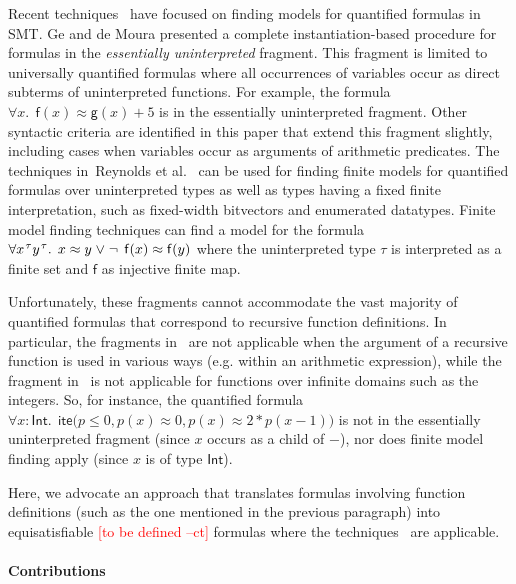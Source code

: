 \documentclass[runningheads,a4paper]{llncs}
\newcommand{\con}[1]{\mathsf{#1}}
\let\oldneg=\neg
\def\neg{\oldneg\:}
\let\oldvee=\vee
\def\vee{\mathrel{\oldvee}}
\newcommand{\teq}{\approx}
\newcommand{\sortint}{\ty{Int}}
\newcommand\ty[1]{\con{#1}}
\newcommand{\lite}{\con{ite}}
\newcommand{\rem}[1]{\textcolor{red}{[#1]}}
\newcommand{\ct}[1]{\rem{#1 --ct}}
\newcommand{\vthinspace}{\kern+0.083333em}
\newcommand{\typ}[1]{^{\vthinspace #1}}
\begin{document}
Recent techniques~\cite{GeDeM-CAV-09, ReyEtAl-1-RR-13} 
have focused on finding models for quantified formulas in SMT.
Ge and de Moura \cite{GeDeM-CAV-09} presented a complete instantiation-based
procedure for formulas in the \emph{essentially uninterpreted} fragment.
This fragment is limited to universally quantified formulas where all
occurrences of variables occur as direct subterms of uninterpreted
functions. For example, the formula $\forall x%
.\;\, \con{f}( x )
\teq \con{g}( x ) + 5$ is in the essentially uninterpreted fragment.
Other syntactic criteria are identified in this paper that extend
this fragment slightly, including cases when variables occur as arguments of
arithmetic predicates. The techniques in~Reynolds et al.\
\cite{ReyEtAl-1-RR-13} can be used for finding finite models for quantified
formulas over uninterpreted types as well as types having a fixed finite
interpretation, such as fixed-width bitvectors and enumerated datatypes.
Finite model finding techniques can
find a model for the formula $\forall x\typ{\tau} y\typ{\tau}.\;\, x \teq
y \vee \neg \con{f}( x ) \teq \con{f}( y )$ where the uninterpreted type $\tau$ is
interpreted as a finite set and $\con{f}$ as injective finite map.

Unfortunately, these fragments cannot accommodate the vast majority of
quantified formulas that correspond to recursive function definitions.
In particular, the fragments in~\cite{GeDeM-CAV-09} are not applicable when the argument of a recursive function is used in various ways (e.g. within an arithmetic expression), 
while the fragment in~\cite{ReyEtAl-1-RR-13} is not applicable for functions over infinite domains such as the integers.
So, for instance, the quantified formula $\forall x : {\sortint}.\;\, \lite\bigl( p \leq 0, p( x ) \teq 0, p( x ) \teq 2 * p( x - 1 ) \bigr)$ 
is not in the essentially uninterpreted fragment (since $x$ occurs as a child of $-$),
nor does finite model finding apply (since $x$ is of type $\sortint$).

Here, we advocate an approach that translates formulas involving function
definitions (such as the one mentioned in the previous paragraph)
into equisatisfiable \ct{to be defined} formulas where the
techniques~\cite{GeDeM-CAV-09, ReyEtAl-1-RR-13} are applicable.

\paragraph{Contributions}
\end{document}
